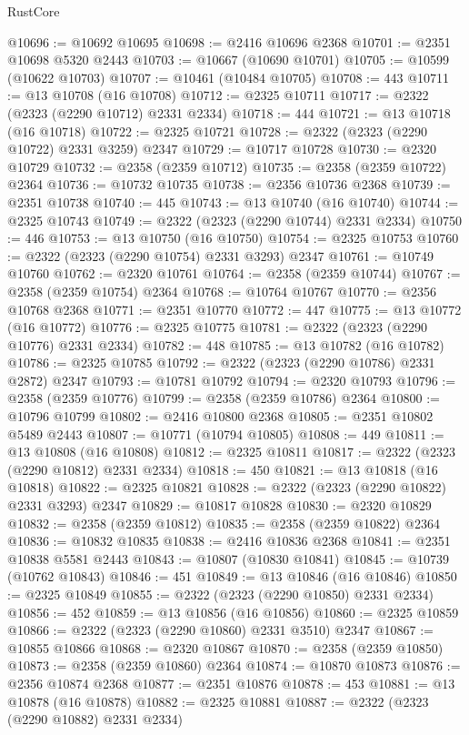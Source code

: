 \begin{lexlean}{RustCore}
\begin{coremodule}
@10696 := @10692 @10695
@10698 := @2416 @10696 @2368
@10701 := @2351 @10698 @5320 @2443
@10703 := @10667 (@10690 @10701)
@10705 := @10599 (@10622 @10703)
@10707 := @10461 (@10484 @10705)
@10708 := 443
@10711 := @13 @10708 (@16 @10708)
@10712 := @2325 @10711
@10717 := @2322 (@2323 (@2290 @10712) @2331 @2334)
@10718 := 444
@10721 := @13 @10718 (@16 @10718)
@10722 := @2325 @10721
@10728 := @2322 (@2323 (@2290 @10722) @2331 @3259) @2347
@10729 := @10717 @10728
@10730 := @2320 @10729
@10732 := @2358 (@2359 @10712)
@10735 := @2358 (@2359 @10722) @2364
@10736 := @10732 @10735
@10738 := @2356 @10736 @2368
@10739 := @2351 @10738
@10740 := 445
@10743 := @13 @10740 (@16 @10740)
@10744 := @2325 @10743
@10749 := @2322 (@2323 (@2290 @10744) @2331 @2334)
@10750 := 446
@10753 := @13 @10750 (@16 @10750)
@10754 := @2325 @10753
@10760 := @2322 (@2323 (@2290 @10754) @2331 @3293) @2347
@10761 := @10749 @10760
@10762 := @2320 @10761
@10764 := @2358 (@2359 @10744)
@10767 := @2358 (@2359 @10754) @2364
@10768 := @10764 @10767
@10770 := @2356 @10768 @2368
@10771 := @2351 @10770
@10772 := 447
@10775 := @13 @10772 (@16 @10772)
@10776 := @2325 @10775
@10781 := @2322 (@2323 (@2290 @10776) @2331 @2334)
@10782 := 448
@10785 := @13 @10782 (@16 @10782)
@10786 := @2325 @10785
@10792 := @2322 (@2323 (@2290 @10786) @2331 @2872) @2347
@10793 := @10781 @10792
@10794 := @2320 @10793
@10796 := @2358 (@2359 @10776)
@10799 := @2358 (@2359 @10786) @2364
@10800 := @10796 @10799
@10802 := @2416 @10800 @2368
@10805 := @2351 @10802 @5489 @2443
@10807 := @10771 (@10794 @10805)
@10808 := 449
@10811 := @13 @10808 (@16 @10808)
@10812 := @2325 @10811
@10817 := @2322 (@2323 (@2290 @10812) @2331 @2334)
@10818 := 450
@10821 := @13 @10818 (@16 @10818)
@10822 := @2325 @10821
@10828 := @2322 (@2323 (@2290 @10822) @2331 @3293) @2347
@10829 := @10817 @10828
@10830 := @2320 @10829
@10832 := @2358 (@2359 @10812)
@10835 := @2358 (@2359 @10822) @2364
@10836 := @10832 @10835
@10838 := @2416 @10836 @2368
@10841 := @2351 @10838 @5581 @2443
@10843 := @10807 (@10830 @10841)
@10845 := @10739 (@10762 @10843)
@10846 := 451
@10849 := @13 @10846 (@16 @10846)
@10850 := @2325 @10849
@10855 := @2322 (@2323 (@2290 @10850) @2331 @2334)
@10856 := 452
@10859 := @13 @10856 (@16 @10856)
@10860 := @2325 @10859
@10866 := @2322 (@2323 (@2290 @10860) @2331 @3510) @2347
@10867 := @10855 @10866
@10868 := @2320 @10867
@10870 := @2358 (@2359 @10850)
@10873 := @2358 (@2359 @10860) @2364
@10874 := @10870 @10873
@10876 := @2356 @10874 @2368
@10877 := @2351 @10876
@10878 := 453
@10881 := @13 @10878 (@16 @10878)
@10882 := @2325 @10881
@10887 := @2322 (@2323 (@2290 @10882) @2331 @2334)

\end{coremodule}
\end{lexlean}
